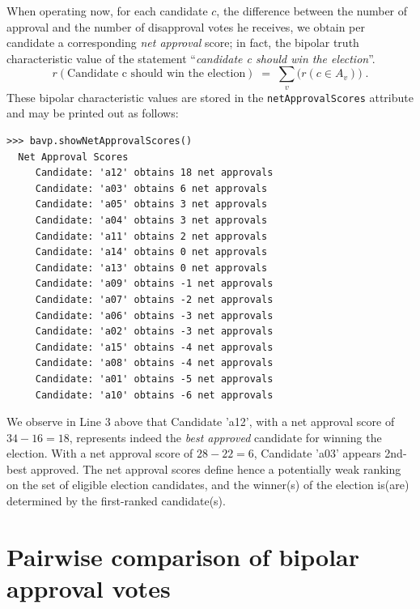 When operating now, for each candidate $c$, the difference between the number of approval and the number of disapproval votes he receives, we obtain per candidate a corresponding \emph{net approval} score; in fact, the bipolar truth characteristic value of the statement ``\emph{candidate c should win the election}''.
\begin{equation}
r(\text{Candidate c should win the election}) \;=\; \sum_v \big(r(c \in A_v)\big)\;.
\end{equation}
These bipolar characteristic values are stored in the \texttt{netApprovalScores} attribute and may be printed out as follows:
\begin{lstlisting}
>>> bavp.showNetApprovalScores()
  Net Approval Scores
     Candidate: 'a12' obtains 18 net approvals
     Candidate: 'a03' obtains 6 net approvals
     Candidate: 'a05' obtains 3 net approvals
     Candidate: 'a04' obtains 3 net approvals
     Candidate: 'a11' obtains 2 net approvals
     Candidate: 'a14' obtains 0 net approvals
     Candidate: 'a13' obtains 0 net approvals
     Candidate: 'a09' obtains -1 net approvals
     Candidate: 'a07' obtains -2 net approvals
     Candidate: 'a06' obtains -3 net approvals
     Candidate: 'a02' obtains -3 net approvals
     Candidate: 'a15' obtains -4 net approvals
     Candidate: 'a08' obtains -4 net approvals
     Candidate: 'a01' obtains -5 net approvals
     Candidate: 'a10' obtains -6 net approvals
\end{lstlisting}
We observe in Line 3 above that Candidate 'a12', with a net approval score of $34 - 16 = 18$, represents indeed the \emph{best approved} candidate for winning the election. With a net approval score of $28-22 = 6$, Candidate 'a03' appears 2nd-best approved. The net approval scores define hence a potentially weak ranking on the set of eligible election candidates, and the winner(s) of the election is(are) determined by the first-ranked candidate(s).

\section{Pairwise comparison of bipolar approval votes}
\label{sec:21.1}



